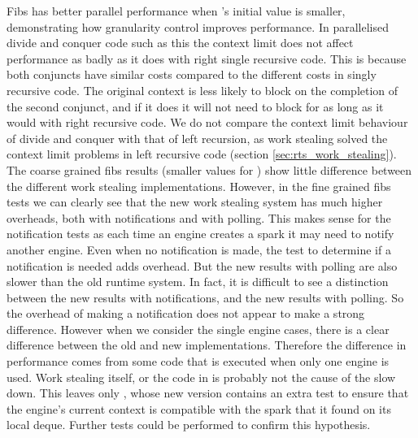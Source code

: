 

Fibs has better parallel performance when \Depth's initial value is
smaller,
demonstrating how granularity control improves performance.
In parallelised divide and conquer code such as this the context limit does
not affect performance as badly as it does with right single recursive code.
This is because both conjuncts have similar costs compared to the different
costs in singly recursive code.
The original context is less likely to block on the completion of the second
conjunct,
and if it does it will not need to block for as long as it would
with right recursive code.
We do not compare the context limit behaviour of divide and conquer with that
of left recursion,
as work stealing solved the context limit problems in left recursive code
(section \ref{sec:rts_work_stealing}).
The coarse grained fibs results (smaller values for \Depth)
show little difference between the different work stealing implementations.
However,
in the fine grained fibs tests we can clearly see that the new work stealing
system has much higher overheads,
both with notifications and with polling.
This makes sense for the notification tests
as each time an engine creates a spark it may need to notify another
engine.
Even when no notification is made,
the test to determine if a notification is needed adds overhead.
But the new results with polling are also slower than the old runtime
system.
In fact,
it is difficult to see a distinction between
the new results with notifications, and the new results with polling.
So the overhead of making a notification does not appear to make a strong
difference.
However when we consider the single engine cases,
there is a clear difference between the old and new implementations.
Therefore the difference in performance comes from some code that is
executed when only one engine is used.
Work stealing itself, or the code in \idle is probably not the cause of the
slow down.
This leaves only \joinandcontinue,
whose new version contains an extra test to ensure that the engine's current
context is compatible with the spark that it found on its local deque.
Further tests could be performed to confirm this hypothesis.

